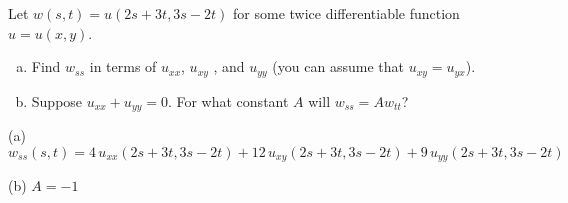 \begin{question}[M200 2015D] %
Let $w(s,t) = u(2s + 3t, 3s - 2t)$ for some twice differentiable function 
$u = u(x, y)$.
\begin{enumerate}[(a)]
\item
Find $w_{ss}$ in terms of $u_{xx}$, $u_{xy}$ , and $u_{yy}$ 
(you can assume that $u_{xy} = u_{yx}$).
\item
Suppose $u_{xx} + u_{yy} = 0$. For what constant $A$ will 
$w_{ss} = Aw_{tt}$?
\end{enumerate}
\end{question}

%

\begin{answer}
(a) $w_{ss}(s,t) =4\,u_{xx}(2s + 3t, 3s - 2t) 
                 +12\,u_{xy}(2s + 3t, 3s - 2t) 
                   +9\,u_{yy}(2s + 3t, 3s - 2t) $

(b) $A=-1$
\end{answer}

